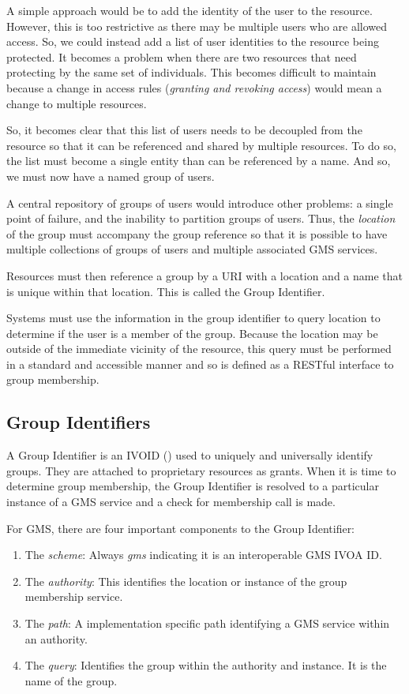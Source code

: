 \documentclass[11pt,a4paper]{ivoa}
\begin{document}
A simple approach would be to add the identity of the user to the resource.  However, this is too restrictive as there may be multiple users who are allowed access.  So, we could instead add a list of user identities to the resource being protected.  It becomes a problem when there are two resources that need protecting by the same set of individuals.  This becomes difficult to maintain because a change in access rules (\emph{granting and revoking access}) would mean a change to multiple resources.

So, it becomes clear that this list of users needs to be decoupled from the resource so that it can be referenced and shared by multiple resources.  To do so, the list must become a single entity than can be referenced by a name.  And so, we must now have a named group of users.

A central repository of groups of users would introduce other problems:  a single point of failure, and the inability to partition groups of users.  Thus, the \emph{location} of the group must accompany the group reference so that it is possible to have multiple collections of groups of users and multiple associated GMS services.

Resources must then reference a group by a URI with a location and a name that is unique within that location.  This is called the Group Identifier.

Systems must use the information in the group identifier to query location to determine if the user is a member of the group.  Because the location may be outside of the immediate vicinity of the resource, this query must be performed in a standard and accessible manner and so is defined as a RESTful interface to group membership.

\subsection{Group Identifiers}

A Group Identifier is an IVOID (\citep{std:VOID2}) used to uniquely and universally identify groups.  They are attached to proprietary resources as grants.  When it is time to determine group membership, the Group Identifier is resolved to a particular instance of a GMS service and a check for membership call is made.

For GMS, there are four important components to the Group Identifier:

\begin{enumerate}
\item The \emph{scheme}: Always \emph{gms} indicating it is an interoperable GMS IVOA ID.
\item The \emph{authority}: This identifies the location or instance of the group membership service.
\item The \emph{path}: A implementation specific path identifying a GMS service within an authority.
\item The \emph{query}: Identifies the group within the authority and instance.  It is the name of the group.
\end{enumerate}
\end{document}
